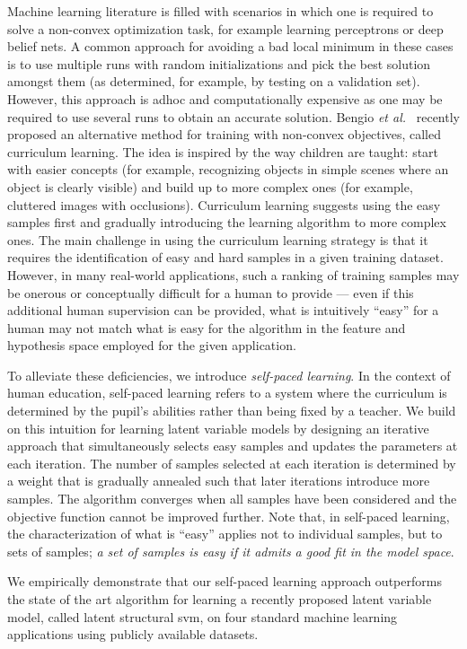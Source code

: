 \documentclass{article}
\begin{document}
Machine learning literature is filled with scenarios in which one is
required to solve a non-convex optimization task, for example learning
perceptrons or deep belief nets. A common approach for avoiding a bad
local minimum in these cases is to use multiple runs with random
initializations and pick the best solution amongst them (as
determined, for example, by testing on a validation set). However,
this approach is adhoc and computationally expensive as one may be required to
use several runs to obtain an accurate solution.
Bengio {\em et al.}~\cite{bengioicml09} recently proposed an
alternative method for training with non-convex objectives, called
curriculum learning. The idea is inspired by the way children are
taught: start with easier concepts (for example, recognizing objects
in simple scenes where an object is clearly visible) and build up to
more complex ones (for example, cluttered images with occlusions).
Curriculum learning suggests using the easy samples first and
gradually introducing the learning algorithm to more complex ones.
The main challenge in using the curriculum learning strategy is that
it requires the identification of easy and hard samples in a given
training dataset.  However, in many real-world applications, such a
ranking of training samples may be onerous or conceptually difficult
for a human to provide --- even if this additional human supervision
can be provided, what is intuitively ``easy'' for a human may not
match what is easy for the algorithm in the feature and hypothesis
space employed for the given application.

To alleviate these deficiencies, we introduce {\em self-paced
learning}. In the context of human education, self-paced learning
refers to a system where the curriculum is determined by the pupil's
abilities rather than being fixed by a teacher. We build on this
intuition for learning latent variable models by designing an
iterative approach that simultaneously selects easy samples and
updates the parameters at each iteration. The number of samples
selected at each iteration is determined by a weight that is gradually
annealed such that later iterations introduce more samples.  The
algorithm converges when all samples have been considered and the
objective function cannot be improved further.  Note that, in
self-paced learning, the characterization of what is ``easy'' applies
not to individual samples, but to sets of samples; {\em a set of
samples is easy if it admits a good fit in the model space}.

We empirically demonstrate that
our self-paced learning approach outperforms the state of the art algorithm for
learning a recently proposed latent variable model, called latent structural
{\sc svm}, on four standard machine learning applications using publicly
available datasets.
\end{document}
